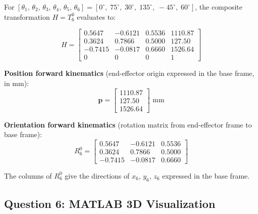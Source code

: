 \documentclass[12pt]{article}
\begin{document}
For $[\theta_1,\,\theta_2,\,\theta_3,\,\theta_4,\,\theta_5,\,\theta_6]
= [0^\circ,\;75^\circ,\;30^\circ,\;135^\circ,\;-45^\circ,\;60^\circ]$, the composite transformation
$H = T_6^0$ evaluates to:

\[
H =
\begin{bmatrix}
 0.5647 & -0.6121 &  0.5536 & 1110.87 \\
 0.3624 &  0.7866 &  0.5000 &  127.50 \\
-0.7415 & -0.0817 &  0.6660 & 1526.64 \\
 0      &  0      &  0      &  1
\end{bmatrix}
\]

\textbf{Position forward kinematics}
(end-effector origin expressed in the base frame, in mm):
\[
\mathbf{p} =
\begin{bmatrix} 1110.87 \\ 127.50 \\ 1526.64 \end{bmatrix} \text{ mm}
\]

\textbf{Orientation forward kinematics}
(rotation matrix from end-effector frame to base frame):
\[
R_6^0 =
\begin{bmatrix}
 0.5647 & -0.6121 &  0.5536 \\
 0.3624 &  0.7866 &  0.5000 \\
-0.7415 & -0.0817 &  0.6660
\end{bmatrix}
\]

The columns of $R_6^0$ give the directions of $x_6$, $y_6$, $z_6$
expressed in the base frame.

\subsection{Question 6: MATLAB 3D Visualization}
\end{document}
